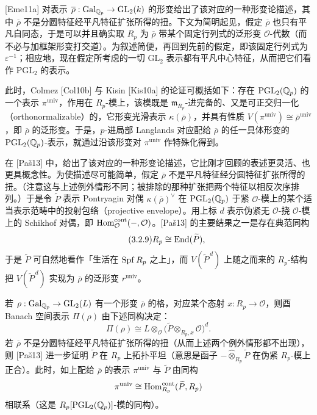 [Eme11a] 对表示 $\overline{\rho}:\operatorname{Gal}_{\mathbb{Q}_p}\to\mathrm{GL}_2(k)$ 的形变给出了该对应的一种形变论描述，其中 $\overline{\rho}$ 不是分圆特征经平凡特征扩张所得的扭。下文为简明起见，假定 $\overline{\rho}$ 也只有平凡自同态，于是可以并且确实取 $R_p$ 为 $\overline{\rho}$ 带某个固定行列式的泛形变 $\mathcal O$-代数（而不必与加框架形变打交道）。为叙述简便，再回到先前的假定，即该固定行列式为 $\varepsilon^{-1}$；相应地，现在假定所考虑的一切 $\mathrm{GL}_2$ 表示都有平凡中心特征，从而把它们看作 $\mathrm{PGL}_2$ 的表示。

此时，Colmez [Col10b] 与 Kisin [Kis10a] 的论证可概括如下：存在 $\mathrm{PGL}_2(\mathbb{Q}_p)$ 的一个表示 $\pi^{\mathrm{univ}}$，作用在 $R_p$-模上，该模既是 $\mathfrak m_{R_p}$-进完备的、又是可正交归一化（orthonormalizable）的，它形变光滑表示 $\kappa(\overline{\rho})$，并具有性质 $V(\pi^{\mathrm{univ}})\cong\overline{\rho}^{\mathrm{univ}}$，即 $\overline{\rho}$ 的泛形变。于是，$p$-进局部 Langlands 对应配给 $\overline{\rho}$ 的任一具体形变的 $\mathrm{PGL}_2(\mathbb{Q}_p)$-表示，就通过沿该形变对 $\pi^{\mathrm{univ}}$ 作特殊化得到。

在 [Paš13] 中，给出了该对应的一种形变论描述，它比刚才回顾的表述更灵活、也更具概念性。为使描述尽可能简单，假定 $\overline{\rho}$ 不是平凡特征经分圆特征扩张所得的扭。（注意这与上述例外情形不同；被排除的那种扩张把两个特征以相反次序排列。）于是令 $\widetilde P$ 表示 Pontryagin 对偶 $\kappa(\overline{\rho})^{\vee}$ 在 $\mathrm{PGL}_2(\mathbb{Q}_p)$ 于紧 $\mathcal O$-模上的某个适当表示范畴中的投射包络（projective envelope）。用上标 $d$ 表示伪紧无 $\mathcal O$-挠 $\mathcal O$-模上的 Schikhof 对偶，即 $\operatorname{Hom}^{\mathrm{cont}}_{\mathcal O}(-,\mathcal O)$。[Paš13] 的主要结果之一是存在典范同构
\begin{equation}\tag{3.2.9}\label{eq:a4-3-2-9}
R_p\cong\operatorname{End}(\widetilde P),
\end{equation}
于是 $\widetilde P$ 可自然地看作「生活在 $\operatorname{Spf} R_p$ 之上」，而 $V(\widetilde P^{\,d})$ 上随之而来的 $R_p$-结构把 $V(\widetilde P^{\,d})$ 实现为 $\overline{\rho}$ 的泛形变 $r^{\mathrm{univ}}$。

若 $\rho:\operatorname{Gal}_{\mathbb{Q}_p}\to\mathrm{GL}_2(L)$ 有一个形变 $\overline{\rho}$ 的格，对应某个态射 $x:R_p\to\mathcal O$，则酉 Banach 空间表示 $\Pi(\rho)$ 由下述同构决定：
\[
\Pi(\rho)\cong L\otimes_{\mathcal O}\bigl(\widetilde P\otimes_{R_p,x}\mathcal O\bigr)^{d}.
\]
若 $\overline{\rho}$ 不是分圆特征经平凡特征扩张所得的扭（从而上述两个例外情形都不出现），则 [Paš13] 进一步证明 $\widetilde P$ 在 $R_p$ 上拓扑平坦（意思是函子 $-\widehat\otimes_{R_p}\widetilde P$ 在伪紧 $R_p$-模上正合）。此时，如上配给 $\overline{\rho}$ 的表示 $\pi^{\mathrm{univ}}$ 与 $\widetilde P$ 由同构
\[
\pi^{\mathrm{univ}}\cong\operatorname{Hom}^{\mathrm{cont}}_{R_p}(\widetilde P,R_p)
\]
相联系（这是 $R_p[\mathrm{PGL}_2(\mathbb{Q}_p)]$-模的同构）。

